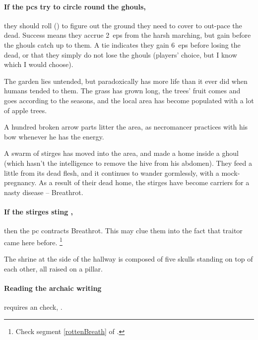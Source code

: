 \begin{multicols}{2}
\paragraph{If the \glspl{pc} try to circle round the ghouls,}
they should roll  (\tn[8]) to figure out the ground they need to cover to out-pace the dead.
Success means they accrue 2~\glspl{ep} from the harsh marching, but gain  before the ghouls catch up to them.
A tie indicates they gain 6~\glspl{ep} before losing the dead, or that they simply do not lose the ghouls (players' choice, but I know which I would choose).


The garden lies untended, but paradoxically has more life than it ever did when humans tended to them.
The grass has grown long, the trees' fruit comes and goes according to the seasons, and the local area has become populated with a lot of apple trees.

A hundred broken arrow parts litter the area, as \gls{necromancer} practices with his bow whenever he has the energy.

A swarm of stirges%
has moved into the area, and made a home inside a ghoul (which hasn't the intelligence to remove the hive from his abdomen).
They feed a little from its dead flesh, and it continues to wander gormlessly, with a mock-pregnancy.
As a result of their dead home, the stirges have become carriers for a nasty disease -- Breathrot.%

\stirgeGhouls

\paragraph{If the stirges sting ,}
then the \gls{pc} contracts Breathrot.
This may clue them into the fact that \gls{traitor} came here before.%
\footnote{\label{broTheftRef}Check \gls{segment} \vref{rottenBreath} of .}



The shrine at the side of the hallway is composed of five skulls standing on top of each other, all raised on a pillar.

\paragraph{Reading the archaic writing}
requires an  check, \tn[10].


\end{multicols}
